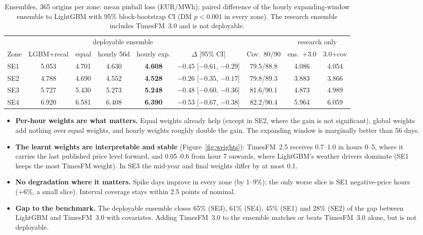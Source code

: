 \documentclass[11pt,a4paper]{article}
\newcommand{\best}[1]{\textbf{#1}}
\begin{document}
\begin{table}[h]
\centering\small
\caption{Ensembles, 365 origins per zone: mean pinball loss (EUR/MWh); paired difference of the
hourly expanding-window ensemble to LightGBM with 95\% block-bootstrap CI (DM $p<0.001$ in every
zone). The research ensemble includes TimesFM~3.0 and is not deployable.}
\label{tab:ensemble}
\footnotesize\setlength{\tabcolsep}{3.5pt}
\begin{tabular}{lcccccc|cc}
\toprule
& & \multicolumn{3}{c}{deployable ensemble} & & & \multicolumn{2}{c}{research only}\\
\cmidrule(lr){3-5}\cmidrule(lr){8-9}
Zone & LGBM+recal & equal & hourly 56d & hourly exp. & $\Delta$ [95\% CI] & Cov.\ 80/90 & ens.\ +3.0 & 3.0+cov\\
\midrule
SE1 & 5.053 & 4.701 & 4.630 & \best{4.608} & $-0.45$ [$-0.61$, $-0.29$] & 79.5/88.8 & 4.086 & 4.054\\
SE2 & 4.788 & 4.690 & 4.552 & \best{4.528} & $-0.26$ [$-0.35$, $-0.17$] & 79.8/89.3 & 3.883 & 3.866\\
SE3 & 5.727 & 5.430 & 5.273 & \best{5.248} & $-0.48$ [$-0.60$, $-0.36$] & 81.6/90.1 & 4.873 & 4.989\\
SE4 & 6.920 & 6.581 & 6.408 & \best{6.390} & $-0.53$ [$-0.67$, $-0.38$] & 82.2/90.4 & 5.964 & 6.059\\
\bottomrule
\end{tabular}
\end{table}

\begin{itemize}
\item \textbf{Per-hour weights are what matters.} Equal weights already help (except in SE2,
where the gain is not significant), global weights add nothing over equal weights, and hourly
weights roughly double the gain. The expanding window is marginally better than 56 days.
\item \textbf{The learnt weights are interpretable and stable} (Figure~\ref{fig:weights}):
TimesFM~2.5 receives 0.7--1.0 in hours 0--5, where it carries the last published price level
forward, and 0.05--0.6 from hour 7 onwards, where LightGBM's weather drivers dominate (SE1 keeps the
most TimesFM weight). In SE3 the mid-year and final weights differ by at most 0.1.
\item \textbf{No degradation where it matters.} Spike days improve in every zone (by 1--9\%);
the only worse slice is SE1 negative-price hours (+6\%, a small slice). Interval coverage stays
within 2.5 points of nominal.
\item \textbf{Gap to the benchmark.} The deployable ensemble closes 65\% (SE3), 61\% (SE4),
45\% (SE1) and 28\% (SE2) of the gap between LightGBM and TimesFM~3.0 with covariates. Adding
TimesFM~3.0 to the ensemble matches or beats TimesFM~3.0 alone, but is not deployable.
\end{itemize}
\end{document}
